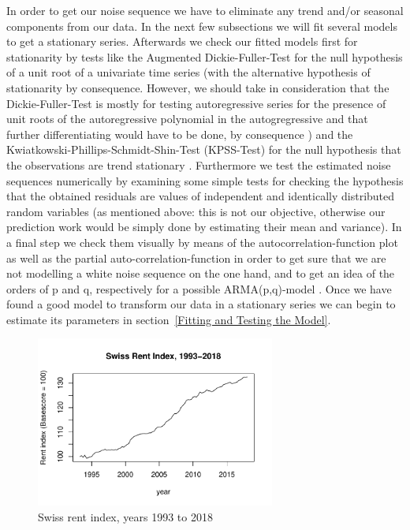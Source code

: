 \documentclass[11pt,a4paper]{article}
\begin{document}
In order to get our noise sequence  we have to eliminate any trend and/or seasonal components from our data. In the next few subsections we will fit several models to get a stationary series. Afterwards we check our fitted models first for stationarity by tests like the Augmented Dickie-Fuller-Test for the null hypothesis of a unit root of a univariate time series (with the alternative hypothesis of stationarity by consequence. However, we should take in consideration that the Dickie-Fuller-Test is mostly for testing autoregressive series for the presence of unit roots of the autoregressive polynomial in the autogregressive and that further differentiating would have to be done, by consequence \cite[p.~194]{bd02} ) \citep{adf} and the Kwiatkowski-Phillips-Schmidt-Shin-Test (KPSS-Test) for the null hypothesis that the observations are trend stationary \citep{kpss92}. Furthermore we test the estimated noise sequences numerically by examining some simple tests 
for checking the hypothesis that the obtained residuals are values of independent and identically distributed random variables (as mentioned above: this is not our objective, otherwise our prediction work would be simply done by estimating their mean and variance). In a final step we check them visually by means of the autocorrelation-function plot as well as the partial auto-correlation-function in order to get sure that we are not modelling a white noise sequence on the one hand, and to get an idea of the orders of p and q, respectively for a possible ARMA(p,q)-model \cite[pp.~83--110]{bd02}.
Once we have found a good model to transform our data in a stationary series we can begin to estimate its parameters in section~\ref{Fitting and Testing the Model}.
\\
\begin{figure}[!ht]
\centering
\includegraphics[angle=0,
width=0.7\textwidth]{indiceloyers_timeseries}
\caption{Swiss rent index, years 1993 to 2018\label{fig:indiceloyers_timeseries}}
\end{figure}
\end{document}
